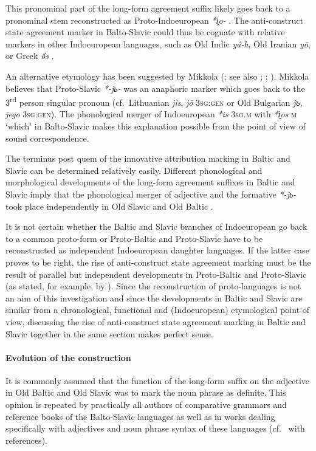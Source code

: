 This pronominal part of the long-form agreement suffix likely goes back to a pronominal stem reconstructed as Proto-Indoeuropean \textit{*i̭o-} \citep[61]{wissemann1958}. The anti-construct state agreement marker in Balto-Slavic could thus be cognate with relative markers in other Indoeuropean languages, such as Old Indic \textit{yá-h}, Old Iranian \textit{yō}, or Greek \textit{ős} \cite[53]{heinrichs1954}.

An alternative etymology has been suggested by Mikkola (\citeyear[52]{mikkola1950}; %
 see also \citealt[102]{leskien1871}; \citealt[164–165]{leskien1919}; \citealt[19ff.]{wijk1935}). Mikkola believes that Proto-Slavic \textit{*-jь-} was an anaphoric marker which goes back to the 3\textsuperscript{rd} person singular pronoun (cf.~Lithuanian \textit{jìs}, \textit{jõ} \textsc{3sg:gen} or Old Bulgarian \textit{jъ}, \textit{jego} \textsc{3sg:gen}). The phonological merger of Indoeuropean \textit{*is} \textsc{3sg.m} with \textit{\textit{*i̭os}} \textsc{m} ‘which’ in Balto-Slavic \cite[21 Footnote 8]{schmidt1959} makes this explanation possible from the point of view of sound correspondence.

The terminus post quem of the innovative attribution marking in Baltic and Slavic can be determined relatively easily. Different phonological and morphological developments of the long-form agreement suffixes in Baltic and Slavic imply that the phonological merger of adjective and the formative \textit{*-jь-} took place independently in Old Slavic and Old Baltic \citep[64–65]{koch1992}. 

It is not certain whether the Baltic and Slavic branches of Indoeuropean go back to a common proto-form or Proto-Baltic and Proto-Slavic have to be reconstructed as independent Indoeuropean daughter languages. If the latter case proves to be right, the rise of anti-construct state agreement marking must be the result of parallel but independent developments in Proto-Baltic and Proto-Slavic (as stated, for example, by \citealt[77]{pohl1980}). Since the reconstruction of proto-languages is not an aim of this investigation and since the developments in Baltic and Slavic are similar from a chronological, functional and (Indoeuropean) etymological point of view, discussing the rise of anti-construct state agreement marking in Baltic and Slavic together in the same section makes perfect sense.

\paragraph{Evolution of the construction} 
It is commonly assumed that the function of the long-form suffix on the adjective in Old Baltic and Old Slavic was to mark the noun phrase as definite. This opinion is repeated by practically all authors of comparative grammars and reference books of the Balto-Slavic languages as well as in works dealing specifically with adjectives and noun phrase syntax of these languages (cf.~\citealt[211]{mendoza2004} with references).

